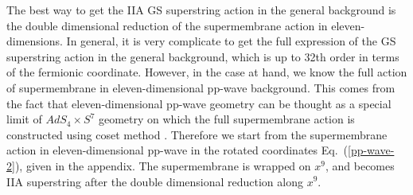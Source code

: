 \documentclass[a4paper,12pt]{article}
\begin{document}
The best way to get the IIA GS superstring action in the general
background is the double dimensional reduction of the supermembrane
action in eleven-dimensions\cite{duf70}.  In general, it is very
complicate to get the full expression of the GS superstring action in
the general background, which is up to 32th order in terms of the
fermionic coordinate. However, in the case at hand, we know the full
action of supermembrane in eleven-dimensional pp-wave background. This
comes from the fact that eleven-dimensional pp-wave geometry can be
thought as a special limit \cite{pen271,bla081} of $AdS_4 \times S^7$
geometry on which the full supermembrane action is constructed using
coset method \cite{dew209}. Therefore we start from the supermembrane
action in eleven-dimensional pp-wave in the rotated coordinates
Eq.~(\ref{pp-wave-2}), given in the appendix. The supermembrane is
wrapped on $x^9$, and becomes IIA superstring after the double
dimensional reduction along $x^9$.
\end{document}
